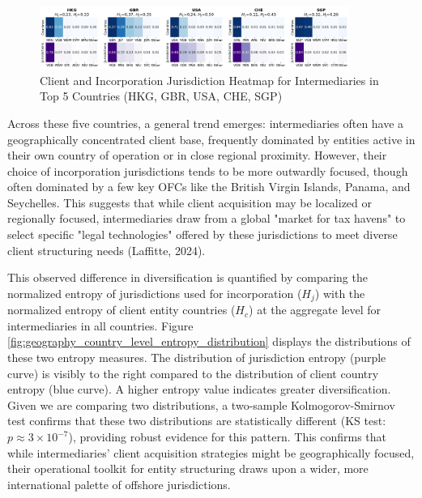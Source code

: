 \begin{figure}[htbp]
    \centering
    \includegraphics[width=0.9\textwidth]{images/Geography_Country_Heatmaps_Top5.png}
    \caption{Client and Incorporation Jurisdiction Heatmap for Intermediaries in Top 5 Countries (HKG, GBR, USA, CHE, SGP)}
    \label{fig:geography_country_heatmaps_top5}
\end{figure}

Across these five countries, a general trend emerges: intermediaries often have a geographically concentrated client base, frequently dominated by entities active in their own country of operation or in close regional proximity. However, their choice of incorporation jurisdictions tends to be more outwardly focused, though often dominated by a few key OFCs like the British Virgin Islands, Panama, and Seychelles. This suggests that while client acquisition may be localized or regionally focused, intermediaries draw from a global "market for tax havens" to select specific "legal technologies" offered by these jurisdictions to meet diverse client structuring needs (Laffitte, 2024). 

This observed difference in diversification is quantified by comparing the normalized entropy of jurisdictions used for incorporation ($H_j$) with the normalized entropy of client entity countries ($H_c$) at the aggregate level for intermediaries in all countries. Figure \ref{fig:geography_country_level_entropy_distribution} displays the distributions of these two entropy measures. The distribution of jurisdiction entropy (purple curve) is visibly to the right compared to the distribution of client country entropy (blue curve). A higher entropy value indicates greater diversification. Given we are comparing two distributions, a two-sample Kolmogorov-Smirnov test confirms that these two distributions are statistically different (KS test: $p \approx 3 \times 10^{-7}$), providing robust evidence for this pattern. This confirms that while intermediaries' client acquisition strategies might be geographically focused, their operational toolkit for entity structuring draws upon a wider, more international palette of offshore jurisdictions.

